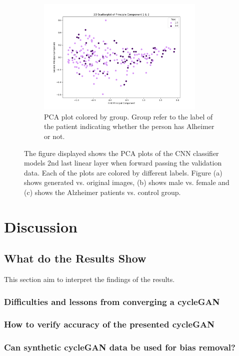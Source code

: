 \documentclass[12pt, fleqn, titlepage]{article}
\newcommand{\1}[1]{\mathds{1}\left[#1\right]}
\begin{document}
\begin{figure}[H]
\begin{subfigure}[t]{0.5\textwidth}
		\centering
		\includegraphics[height=2.2in]{imgs/classifier/not_generated_imgs_pca_group}%
		\caption{PCA plot colored by group. Group refer to the label of the patient indicating whether the person has Alheimer or not.}
	\end{subfigure}
	\label{fig:type_1}
	\caption{The figure displayed shows the PCA plots of the CNN classifier models 2nd last linear layer when forward passing the validation data. Each of the plots are colored by different labels. Figure (a) shows generated vs. original images, (b) shows male vs. female and (c) shows the Alzheimer patients vs. control group. }
\end{figure}



\section{Discussion}\label{discussion}

\subsection{What do the Results Show}\label{discussionOfResults}
This section aim to interpret the findings of the results. 

\subsubsection{Difficulties and lessons from converging a cycleGAN}

\subsubsection{How to verify accuracy of the presented cycleGAN}

\subsubsection{Can synthetic cycleGAN data be used for bias removal?}
\end{document}
